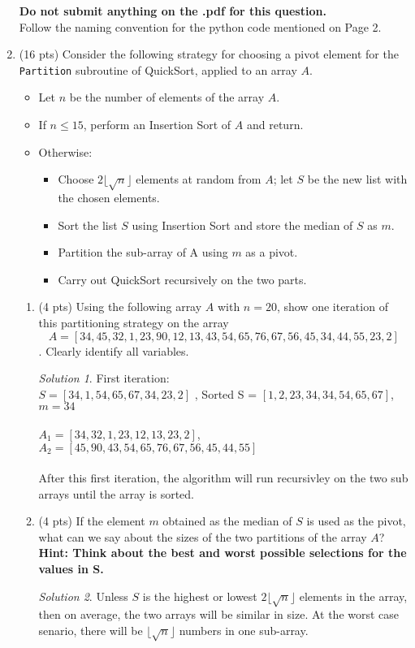 \documentclass[12pt]{article}
\theoremstyle{remark}
\newtheorem*{solution}{Solution}
\begin{document}
\begin{enumerate}
\textbf{Do not submit anything on the .pdf for this question.}\\
Follow the naming convention for the python code mentioned on Page 2.
\pagebreak


\item (16 pts) Consider the following strategy for choosing a pivot element for the {\tt Partition} subroutine of QuickSort, applied to an array $A$.
\begin{itemize}
\item Let $n$ be the number of elements of the array $A$.
\item If $n\leq 15$, perform an Insertion Sort of $A$ and return.
\item Otherwise:
	\begin{itemize}
	\item Choose $2\lfloor \sqrt{n} \rfloor$ elements at random from $A$; let $S$ be the new list with the chosen elements.
	\item Sort the list $S$ using Insertion Sort and store the median of $S$ as $m$.
	\item Partition the sub-array of A using $m$ as a pivot.
	\item Carry out QuickSort recursively on the two parts.
	\end{itemize}
\end{itemize}
\begin{enumerate}
\item (4 pts) Using the following array $A$ with $n=20$, show one iteration of this partitioning strategy on the array $$A=[34, 45, 32, 1, 23, 90, 12, 13, 43, 54, 65, 76, 67, 56, 45, 34, 44, 55, 23, 2]$$. Clearly identify all variables.\\
\begin{solution}
First iteration: \\
$S = [34, 1, 54, 65, 67, 34, 23, 2]$ , Sorted S = $[1, 2, 23, 34, 34, 54, 65, 67]$, $m = 34$ \\ \\
$A_1 = [34, 32, 1, 23, 12, 13, 23, 2]$, $A_2 = [45, 90, 43, 54, 65, 76, 67, 56, 45, 44, 55]$ \\ \\
After this first iteration, the algorithm will run recursivley on the two sub arrays until the array is sorted.
\end{solution}
\pagebreak

\item (4 pts) If the element $m$ obtained as the median of $S$ is used as the pivot, what can we say about the sizes of the two partitions of the array $A$? \textbf{Hint: Think about the best and worst possible selections for the values in S.}\\
\begin{solution}
Unless $S$ is the highest or lowest $2\lfloor \sqrt{n} \rfloor$ elements in the array, then on average, the two arrays will be similar in size. At the worst case senario, there will be $\lfloor \sqrt{n} \rfloor$ numbers in one sub-array.
\end{solution}


\end{enumerate}
\end{enumerate}
\end{document}
